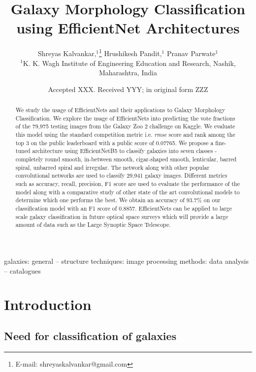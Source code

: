 \documentclass[fleqn,usenatbib]{mnras}
\title[Galaxy Morphologies with EfficientNets]{Galaxy Morphology Classification using EfficientNet Architectures}
\author[S. Kalvankar et al.]{
Shreyas Kalvankar,$^{1}$\thanks{E-mail: shreyaskalvankar@gmail.com}
Hrushikesh Pandit,$^{1}$
Pranav Parwate$^{1}$
\\
$^{1}$K. K. Wagh Institute of Engineering Education and Research, Nashik, Maharashtra, India\\
}
\date{Accepted XXX. Received YYY; in original form ZZZ}
\begin{document}
\label{firstpage}
\pagerange{\pageref{firstpage}--\pageref{lastpage}}
\maketitle

\begin{abstract}
We study the usage of EfficientNets and their applications to Galaxy Morphology Classification. We explore the usage of EfficientNets into predicting the vote fractions of the 79,975 testing images from the Galaxy Zoo 2 challenge on Kaggle. We evaluate this model using the standard competition metric i.e. \textit{rmse} score and rank among the top 3 on the public leaderboard with a public score of 0.07765. We propose a fine-tuned architecture using EfficientNetB5 to classify galaxies into seven classes - completely round smooth, in-between smooth, cigar-shaped smooth, lenticular, barred spiral, unbarred spiral and irregular. The network along with other popular convolutional networks are used to classify 29,941 galaxy images. Different metrics such as accuracy, recall, precision, F1 score are used to evaluate the performance of the model along with a comparative study of other state of the art convolutional models to determine which one performs the best. We obtain an accuracy of 93.7\% on our classification model with an F1 score of 0.8857. EfficientNets can be applied to large scale galaxy classification in future optical space surveys which will provide a large amount of data such as the Large Synoptic Space Telescope. 
\end{abstract}

\begin{keywords}
galaxies: general -- structure techniques: image processing methods: data analysis -- catalogues
\end{keywords}



\section{Introduction}


\subsection{Need for classification of galaxies}
\end{document}
